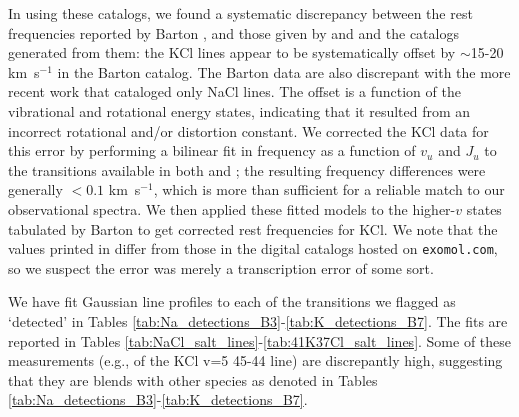 \documentclass[12pt]{article}
\newcommand{\kms}{\textrm{km~s}\ensuremath{^{-1}}\xspace}	%
\begin{document}
In using these catalogs, we found a systematic discrepancy between the rest
frequencies reported by Barton \cite{Barton2014a}, and those given by
\cite{Caris2004a} and \cite{Caris2002a} and the catalogs generated from them:
the KCl lines appear to be systematically offset by $\sim$15-20 \kms in the
Barton catalog.  
The Barton data are also discrepant with the more recent
\cite{Cabezas2016a} work that cataloged only NaCl lines.
The offset is a
function of the vibrational and rotational energy states, indicating that it
resulted from an incorrect rotational and/or distortion constant.  We
corrected the KCl data
for this error by performing a bilinear fit in frequency as a function of $v_u$
and $J_u$ to the transitions available in both \cite{Barton2014a} and
\cite{Caris2004a}; the resulting
frequency differences were generally $<0.1$ \kms, which is more than sufficient
for a reliable match to our observational spectra.  We then applied these
fitted models to the higher-$v$ states tabulated by Barton to get corrected
rest frequencies for KCl.  %
We note that the values printed in \cite{Barton2014a} differ from
those in the digital catalogs hosted on \texttt{exomol.com}, so we suspect the
error was merely a transcription error of some sort.










We have fit Gaussian line profiles to each of the transitions we flagged as
`detected' in Tables \ref{tab:Na_detections_B3}-\ref{tab:K_detections_B7}.
The fits are reported in Tables
\ref{tab:NaCl_salt_lines}-\ref{tab:41K37Cl_salt_lines}.  Some of these
measurements (e.g., of the KCl v=5 45-44 line) are discrepantly
high, suggesting that they are blends with other species as denoted in 
Tables \ref{tab:Na_detections_B3}-\ref{tab:K_detections_B7}.
\end{document}
